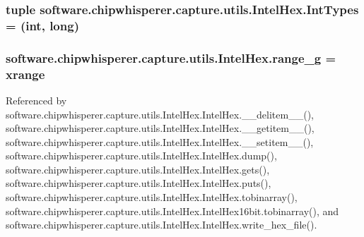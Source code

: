\subsubsection[{Int\+Types}]{\setlength{\rightskip}{0pt plus 5cm}tuple software.\+chipwhisperer.\+capture.\+utils.\+Intel\+Hex.\+Int\+Types = (int, long)}\label{namespacesoftware_1_1chipwhisperer_1_1capture_1_1utils_1_1IntelHex_a34682ee317fa430599b7c44473a9f2c8}
\hypertarget{namespacesoftware_1_1chipwhisperer_1_1capture_1_1utils_1_1IntelHex_abac275d54b0c0dc47a6ef2f7c4f7bcdf}{}
\subsubsection[{range\+\_\+g}]{\setlength{\rightskip}{0pt plus 5cm}software.\+chipwhisperer.\+capture.\+utils.\+Intel\+Hex.\+range\+\_\+g = xrange}\label{namespacesoftware_1_1chipwhisperer_1_1capture_1_1utils_1_1IntelHex_abac275d54b0c0dc47a6ef2f7c4f7bcdf}


Referenced by software.\+chipwhisperer.\+capture.\+utils.\+Intel\+Hex.\+Intel\+Hex.\+\_\+\+\_\+delitem\+\_\+\+\_\+(), software.\+chipwhisperer.\+capture.\+utils.\+Intel\+Hex.\+Intel\+Hex.\+\_\+\+\_\+getitem\+\_\+\+\_\+(), software.\+chipwhisperer.\+capture.\+utils.\+Intel\+Hex.\+Intel\+Hex.\+\_\+\+\_\+setitem\+\_\+\+\_\+(), software.\+chipwhisperer.\+capture.\+utils.\+Intel\+Hex.\+Intel\+Hex.\+dump(), software.\+chipwhisperer.\+capture.\+utils.\+Intel\+Hex.\+Intel\+Hex.\+gets(), software.\+chipwhisperer.\+capture.\+utils.\+Intel\+Hex.\+Intel\+Hex.\+puts(), software.\+chipwhisperer.\+capture.\+utils.\+Intel\+Hex.\+Intel\+Hex.\+tobinarray(), software.\+chipwhisperer.\+capture.\+utils.\+Intel\+Hex.\+Intel\+Hex16bit.\+tobinarray(), and software.\+chipwhisperer.\+capture.\+utils.\+Intel\+Hex.\+Intel\+Hex.\+write\+\_\+hex\+\_\+file().

\hypertarget{namespacesoftware_1_1chipwhisperer_1_1capture_1_1utils_1_1IntelHex_ae461be5d25f46823cb710380e27eb1a1}{}
